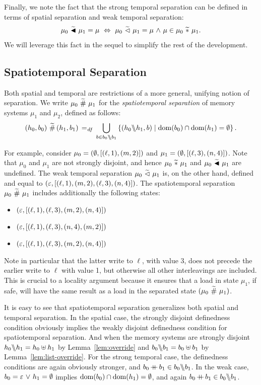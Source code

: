 \documentclass[11pt]{report}         %
\begin{document}
Finally, we note the fact that the strong temporal separation can be defined in terms of spatial separation and weak temporal separation: \[ \mu_0 \operatorname{\,\widetilde{\blacktriangleleft}\,} \mu_1 = \mu \,\,\Leftrightarrow\,\, \mu_0 \operatorname{\,\widetilde{\vartriangleleft}\,} \mu_1 = \mu \operatorname{\,\wedge\,} \mu \in \mu_0 \operatorname{\,\widetilde{\ast}\,} \mu_1.\] We will leverage this fact in the sequel to simplify the rest of the development. 

\subsection{Spatiotemporal Separation}
\label{sec:sequential-spatiotemporal-separation}

Both spatial and temporal are restrictions of a more general, unifying notion of separation. We write $\mu_0 \operatorname{\,\widetilde{\#}\,} \mu_1$ for the \emph{spatiotemporal separation} of memory systems $\mu_1$ and $\mu_2$, defined as follows: \[ (h_0,b_0) \operatorname{\,\widetilde{\#}\,} (h_1,b_1) \operatorname{\;=_{\mathit{df}}\;} \bigcup_{b \in b_0 \backslash\!\!\backslash b_1} \left\lbrace (h_0 \backslash\!\!\backslash h_1, b) \mid \operatorname{\mathrm{dom}}(b_0) \cap \operatorname{\mathrm{dom}}(h_1) = \operatorname{\emptyset} \right\rbrace.\] 

For example, consider $\mu_0 = (\operatorname{\emptyset},\left[(\ell,1),(m,2)\right])$ and $\mu_1 = (\operatorname{\emptyset},\left[(\ell,3),(n,4)\right])$. Note that $\mu_0$ and $\mu_1$ are not strongly disjoint, and hence $\mu_0 \operatorname{\,\widetilde{\ast}\,} \mu_1$ and $\mu_0 \operatorname{\,\widetilde{\blacktriangleleft}\,} \mu_1$ are undefined. The weak temporal separation $\mu_0 \operatorname{\,\widetilde{\vartriangleleft}\,} \mu_1$ is, on the other hand, defined and equal to $(\varepsilon,\left[(\ell,1),(m,2),(\ell,3),(n,4)\right])$. The spatiotemporal separation $\mu_0 \operatorname{\,\widetilde{\#}\,} \mu_1$ includes additionally the following states: \begin{itemize} \item $(\varepsilon,\left[(\ell,1),(\ell,3),(m,2),(n,4)\right])$
  \item $(\varepsilon,\left[(\ell,1),(\ell,3),(n,4),(m,2)\right])$
  \item $(\varepsilon,\left[(\ell,1),(\ell,3),(m,2),(n,4)\right])$
\end{itemize} Note in particular that the latter write to $\ell$, with value $3$, does not precede the earlier write to $\ell$ with value 1, but otherwise all other interleavings are included. This is crucial to a locality argument because it ensures that a load in state $\mu_1$, if safe, will have the same result as a load in the separated state $(\mu_0 \operatorname{\,\widetilde{\#}\,} \mu_1)$. 

It is easy to see that spatiotemporal separation generalizes both spatial and temporal separation. In the spatial case, the strongly disjoint definedness condition obviously implies the weakly disjoint definedness condition for spatiotemporal separation. And when the memory systems are strongly disjoint $h_0 \backslash\!\!\backslash h_1 = h_0 \uplus h_1$ by Lemma~\ref{lem:override} and $b_0 \backslash\!\!\backslash b_1 = b_0 \uplus b_1$ by Lemma~\ref{lem:list-override}. For the strong temporal case, the definedness conditions are again obviously stronger, and $b_0 \operatorname{+\!\!\!+} b_1 \in b_0 \backslash\!\!\backslash b_1$. In the weak case, $b_0 = \varepsilon \operatorname{\,\vee\,} h_1 = \operatorname{\emptyset}$ implies $\operatorname{\mathrm{dom}}(b_0) \cap \operatorname{\mathrm{dom}}(h_1) = \operatorname{\emptyset}$, and again $b_0 \operatorname{+\!\!\!+} b_1 \in b_0 \backslash\!\!\backslash b_1$. 
\end{document}
